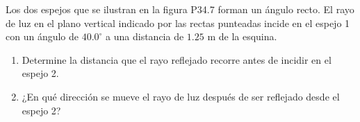 \item Los dos espejos que se ilustran en la figura P34.7 forman un ángulo recto. El rayo de luz en el plano vertical indicado por las rectas punteadas incide en el espejo 1 con un ángulo de $40.0^\circ$ a una distancia de $1.25\text{ m}$ de la esquina.
\begin{enumerate}
    \item Determine la distancia que el rayo reflejado recorre antes de incidir en el espejo 2.
    \item ¿En qué dirección se mueve el rayo de luz después de ser reflejado desde el espejo 2?
\end{enumerate}